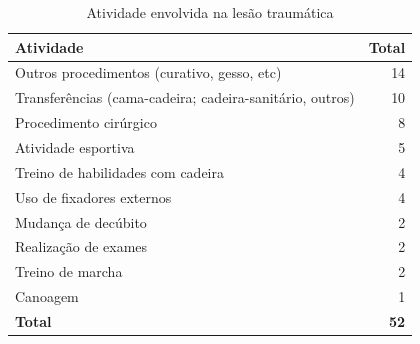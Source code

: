 \documentclass[
  a4paper]{article}
\begin{document}
\begin{table}[H]

\caption{\label{tab:unnamed-chunk-24}Tipo de Lesão Traumática}
\centering
{}
\end{table}

\begin{table}[H]

\caption{\label{tab:unnamed-chunk-25}Atividade envolvida na lesão traumática}
\centering
\begin{tabular}[t]{lr}
\toprule
Atividade & Total\\
\midrule
Outros procedimentos (curativo, gesso, etc) & 14\\
Transferências (cama-cadeira; cadeira-sanitário, outros) & 10\\
Procedimento cirúrgico & 8\\
Atividade esportiva & 5\\
Treino de habilidades com cadeira & 4\\
\addlinespace
Uso de fixadores externos & 4\\
Mudança de decúbito & 2\\
Realização de exames & 2\\
Treino de marcha & 2\\
Canoagem & 1\\
\midrule
\addlinespace
\textbf{Total} & \textbf{52}\\
\bottomrule
\end{tabular}
\end{table}
\end{document}
